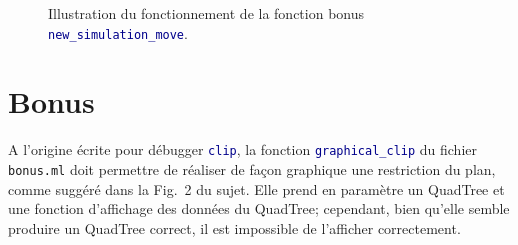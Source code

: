 \documentclass[11pt]{scrartcl}
\newcommand{\funname}[1]{\texttt{\textcolor{darkblue}{#1}}}
\newcommand{\filename}[1]{\texttt{\textcolor{darkbrown}{#1}}}
\begin{document}
\begin{description}
\begin{figure}[h]
	\centering
	\caption{\label{q23bonus} Illustration du fonctionnement de la fonction bonus \funname{new_simulation_move}.}
\end{figure}

\clearpage

\end{description}

\section*{Bonus}
A l'origine écrite pour débugger \funname{clip}, la fonction \funname{graphical_clip} du fichier \filename{bonus.ml} doit permettre de réaliser de façon graphique une restriction du plan, comme suggéré dans la Fig.~2 du sujet. Elle prend en paramètre un QuadTree et une fonction d'affichage des données du QuadTree; cependant, bien qu'elle semble produire un QuadTree correct, il est impossible de l'afficher correctement. 
\end{document}
